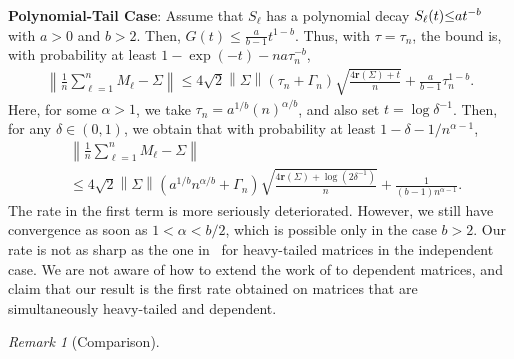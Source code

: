 \documentclass[11pt,a4paper]{article}
\theoremstyle{remark}
\newtheorem{remark}{Remark}
\theoremstyle{definition}
\newcommand{\bc}{c}
\newcommand{\bm}{m}
\theoremstyle{definition}
\newcommand{\Surv}{S}
\newcommand{\rc}{\color{black}}
\begin{document}
\begin{bibunit}[apalike]
\textbf{Polynomial-Tail Case}: 
Assume that {\rc$\Surv_\ell$} has a polynomial decay $\Surv_\ell(t) {\rc\le}  a t^{-b} $ with $a > 0$ and $b>2$. Then, $G(t) \leq \frac{a}{b-1} t^{1-b} $. Thus, with $\tau = \tau_n$, the bound is, with probability at least $1-\exp(-t)-n a \tau_n^{-b}$,
\begin{align*}
    \left\|\frac{1}{n}\sum_{\ell=1}^{n} M_{\ell}-\Sigma\right\|\le 4\sqrt{2}\left\|\Sigma\right\|\left( \tau_n+\Gamma_{n}\right)\sqrt{\frac{4\mathbf{r}\left(\Sigma\right)+t}{n}} + \frac{a}{b-1} \tau_n^{1-b}.
\end{align*}
Here, for some $\alpha>1$, we take $ \tau_n = a^{1/b} (n)^{\alpha /b} $, and also set $t = \log \delta^{-1}$.
Then, for any $\delta \in (0,1)$, we obtain that with probability at least $1-\delta-1/n^{\alpha-1} $,
\begin{align*}
    &\left\|\frac{1}{n}\sum_{\ell=1}^{n} M_{\ell}-\Sigma\right\|\\
    &\le 4\sqrt{2}\left\|\Sigma\right\|\left(a^{1/b}n^{\alpha/b} +\Gamma_{n}\right)\sqrt{\frac{4\mathbf{r}\left(\Sigma\right)+ \log(2\delta^{-1})}{n}} + \frac{1}{(b-1) n^{\alpha-1}}  .
\end{align*}
The rate in the first term is more seriously deteriorated. However, we still have convergence as soon as $1<\alpha<b/2$, which is possible only in the case $b>2$. Our rate is not as sharp as the one in~\cite{srivastava2013covariance} for heavy-tailed matrices in the independent case. We are not aware of how to extend the work of \cite{srivastava2013covariance} to dependent matrices, and claim that our result is {\rc the first rate} obtained on matrices that are simultaneously heavy-tailed and dependent.
\begin{remark}[Comparison]

\end{remark}
\end{bibunit}
\end{document}
